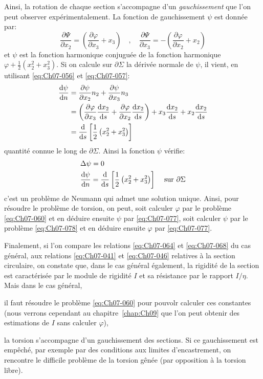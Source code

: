Ainsi, la rotation de chaque section s'accompagne d'un \emph{gauchissement} que l'on peut observer expérimentalement.
La fonction de gauchissement $\psi$ est donnée par: 
\begin{equation}
    \frac{\partial \Psi}{\partial x_2} = \left( \frac{\partial \varphi}{\partial x_3} + x_3 \right) \quad , \quad \frac{\partial \Psi}{\partial x_3} = -\left( \frac{\partial \varphi}{\partial x_2} + x_2 \right)
    \label{eq:Ch07-077}
\end{equation}
et $\psi$ est la fonction harmonique conjuguée de la fonction harmonique $\varphi + \frac{1}{2} (x_2^2 + x_3^2)$.
Si on calcule sur $\partial \Sigma$ la dérivée normale de $\psi$, il vient, en utilisant \eqref{eq:Ch07-056} et \eqref{eq:Ch07-057}: 
\begin{align*}
    \frac{\mathop{\mathrm{{}d}}\mathopen{} \psi}{\mathop{\mathrm{{}d}}\mathopen{} n} &= \frac{\partial \psi}{\partial x_2} n_2 + \frac{\partial \psi}{\partial x_3} n_3 \\
    &= \left( \frac{\partial \varphi}{\partial x_3} \frac{\mathop{\mathrm{{}d}}\mathopen{} x_2}{\mathop{\mathrm{{}d}}\mathopen{} s} + \frac{\partial \varphi}{\partial x_2} \frac{\mathop{\mathrm{{}d}}\mathopen{} x_2}{\mathop{\mathrm{{}d}}\mathopen{} s} \right) + x_3 \frac{\mathop{\mathrm{{}d}}\mathopen{} x_2}{\mathop{\mathrm{{}d}}\mathopen{} s} + x_2 \frac{\mathop{\mathrm{{}d}}\mathopen{} x_2}{\mathop{\mathrm{{}d}}\mathopen{} s} \\
    &= \frac{\mathop{\mathrm{{}d}}\mathopen{}}{\mathop{\mathrm{{}d}}\mathopen{} s} \left[ \frac{1}{2} \left( x_2^2 + x_3^2 \right) \right]
\end{align*}
quantité connue le long de $\partial \Sigma$.
Ainsi la fonction $\psi$ vérifie:
\begin{equation}
    \begin{aligned}
        &\Delta \psi = 0 \\
        &\frac{\mathop{\mathrm{{}d}}\mathopen{} \psi}{\mathop{\mathrm{{}d}}\mathopen{} n} = \frac{\mathop{\mathrm{{}d}}\mathopen{}}{\mathop{\mathrm{{}d}}\mathopen{} s} \left[ \frac{1}{2} \left( x_2^2 + x_3^2 \right) \right] & \text{ sur } \partial \Sigma
    \end{aligned}
    \label{eq:Ch07-078}
\end{equation}
c'est un problème de Neumann qui admet une solution unique.
Ainsi, pour résoudre le problème de torsion, on peut, soit calculer $\varphi$ par le problème \eqref{eq:Ch07-060} et en déduire ensuite $\psi$ par \eqref{eq:Ch07-077}, soit calculer $\psi$ par le problème \eqref{eq:Ch07-078} et en déduire ensuite $\varphi$ par \eqref{eq:Ch07-077}. 

Finalement, si l'on compare les relations \eqref{eq:Ch07-064} et \eqref{eq:Ch07-068} du cas général, aux relations \eqref{eq:Ch07-041} et \eqref{eq:Ch07-046} relatives à la section circulaire, on constate que, dans le cas général également, la rigidité de la section est caractérisée par le module de rigidité $I$ et sa résistance par le rapport $I/\eta$.
Mais dans le cas général, 
\begin{inparaenum}[a)]
    \item il faut résoudre le problème \eqref{eq:Ch07-060} pour pouvolr calculer ces constantes (nous verrons cependant au chapitre~\ref{chap:Ch09} que l'on peut obtenir des estimations de $I$ sans calculer $\varphi$),
    \item la torsion s'accompagne d'un gauchissement des sections.
        Si ce gauchissement est empêché, par exemple par des conditions aux limites d'encastrement, on rencontre le difficile problème de la torsion gênée (par opposition à la torsion libre).
\end{inparaenum}

